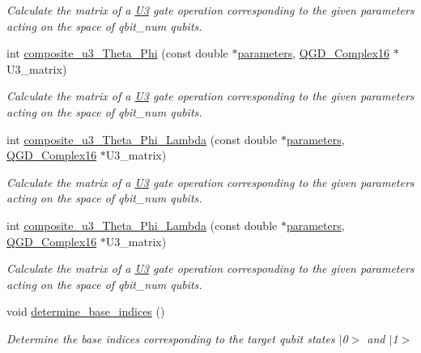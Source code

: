 \begin{DoxyCompactItemize}
\begin{DoxyCompactList}\small\item\em Calculate the matrix of a \hyperlink{class_u3}{U3} gate operation corresponding to the given parameters acting on the space of qbit\+\_\+num qubits. \end{DoxyCompactList}\item 
int \hyperlink{class_u3_a612a9f7b336c2ad7714945747c0591f8}{composite\+\_\+u3\+\_\+\+Theta\+\_\+\+Phi} (const double $\ast$\hyperlink{class_u3_a6b07be37e63be67b306393a90d759f70}{parameters}, \hyperlink{struct_q_g_d___complex16}{Q\+G\+D\+\_\+\+Complex16} $\ast$U3\+\_\+matrix)
\begin{DoxyCompactList}\small\item\em Calculate the matrix of a \hyperlink{class_u3}{U3} gate operation corresponding to the given parameters acting on the space of qbit\+\_\+num qubits. \end{DoxyCompactList}\item 
int \hyperlink{class_u3_ac04802d09973ae38395c2bba68d9b018}{composite\+\_\+u3\+\_\+\+Theta\+\_\+\+Phi\+\_\+\+Lambda} (const double $\ast$\hyperlink{class_u3_a6b07be37e63be67b306393a90d759f70}{parameters}, \hyperlink{struct_q_g_d___complex16}{Q\+G\+D\+\_\+\+Complex16} $\ast$U3\+\_\+matrix)
\begin{DoxyCompactList}\small\item\em Calculate the matrix of a \hyperlink{class_u3}{U3} gate operation corresponding to the given parameters acting on the space of qbit\+\_\+num qubits. \end{DoxyCompactList}\item 
int \hyperlink{class_u3_ac04802d09973ae38395c2bba68d9b018}{composite\+\_\+u3\+\_\+\+Theta\+\_\+\+Phi\+\_\+\+Lambda} (const double $\ast$\hyperlink{class_u3_a6b07be37e63be67b306393a90d759f70}{parameters}, \hyperlink{struct_q_g_d___complex16}{Q\+G\+D\+\_\+\+Complex16} $\ast$U3\+\_\+matrix)
\begin{DoxyCompactList}\small\item\em Calculate the matrix of a \hyperlink{class_u3}{U3} gate operation corresponding to the given parameters acting on the space of qbit\+\_\+num qubits. \end{DoxyCompactList}\item 
void \hyperlink{class_u3_a046fa59a3a019a2d9cc6d30636c75148}{determine\+\_\+base\+\_\+indices} ()
\begin{DoxyCompactList}\small\item\em Determine the base indices corresponding to the target qubit states $\vert$0$>$ and $\vert$1$>$ \end{DoxyCompactList}\item 

\end{DoxyCompactItemize}
